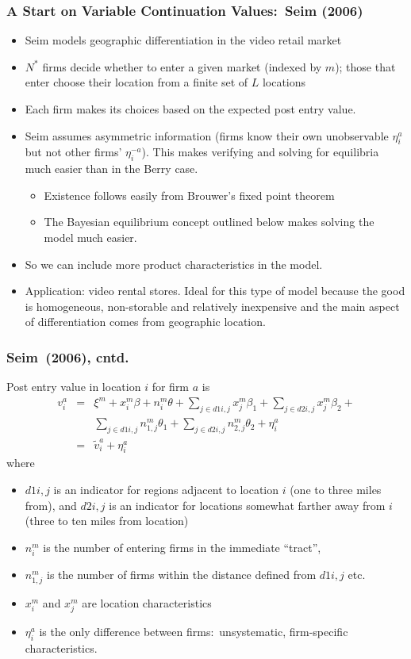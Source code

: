 \documentclass[xcolor=pdftex,dvipsnames,table,mathserif]{beamer}
\begin{document}
\begin{frame}\frametitle{A Start on Variable Continuation Values:\ Seim (2006)}
\footnotesize
\begin{itemize}
\item Seim models geographic differentiation in the video retail market
\item $N^{\ast }$ firms decide whether to enter a given market (indexed by $%
m $); those that enter choose their location from a finite set of $L$
locations
\item Each firm makes its choices based on the expected post entry value.
\item Seim assumes asymmetric information (firms know their own unobservable 
$\eta _{i}^{a}$ but not other firms' $\eta _{i}^{-a}$). This makes verifying
and solving for equilibria much easier than in the Berry case.
\begin{itemize}
\item Existence follows easily from Brouwer's fixed point theorem
\item The Bayesian equilibrium concept outlined below makes solving the
model much easier.
\end{itemize}
\item So we can include more product characteristics in the model.
\item Application: video rental stores. Ideal for this type of model because
the good is homogeneous, non-storable and relatively inexpensive and the
main aspect of differentiation comes from geographic location.
\end{itemize}
\end{frame}

\begin{frame}\frametitle{Seim\ (2006), cntd.}
\footnotesize
Post entry value in location $i$ for firm $a$ is 
\begin{eqnarray*}
v_{i}^{a} &=&\xi ^{m}+x_{i}^{m}\beta +n_{i}^{m}\theta +\sum_{j\in
d1i,j}x_{j}^{m}\beta _{1}+\sum_{j\in d2i,j}x_{j}^{m}\beta _{2}+ \\
&&\sum_{j\in d1i,j}n_{1,j}^{m}\theta _{1}+\sum_{j\in d2i,j}n_{2,j}^{m}\theta
_{2}+\eta _{i}^{a} \\
&=&\tilde{v}_{i}^{a}+\eta _{i}^{a}
\end{eqnarray*}
where
\begin{itemize}
\item $d1i,j$ is an indicator for regions adjacent to location $i$ (one to
three miles from), and $d2i,j$ is an indicator for locations somewhat
farther away from $i$ (three to ten miles from location)
\item $n_{i}^{m}$ is the number of entering firms in the immediate
\textquotedblleft tract\textquotedblright ,
\item $n_{1,j}^{m}$ is the number of firms within the distance defined from $%
d1i,j$ etc.
\item $x_{i}^{m}$ and $x_{j}^{m}$ are location characteristics
\item $\eta _{i}^{a}$ is the only difference between firms:\ unsystematic,
firm-specific characteristics.
\end{itemize}
\end{frame}
\end{document}
